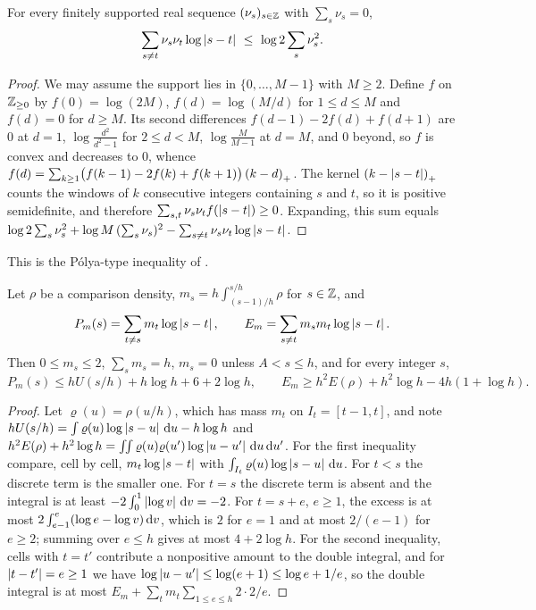 \begin{lemma}\label{lem:polya}
For every finitely supported real sequence $(\nu_s)_{s\in\mathbb{Z}}$ with $\sum_s\nu_s=0$,
\[
  \sum_{s\ne t}\nu_s\nu_t\log\abs{s-t}\ \le\ \log2\sum_s\nu_s^2 .
\]
\end{lemma}

\begin{proof}
We may assume the support lies in $\{0,\dots,M-1\}$ with $M\ge2$. Define $f$ on $\mathbb{Z}_{\ge0}$ by
$f(0)=\log(2M)$, $f(d)=\log(M/d)$ for $1\le d\le M$ and $f(d)=0$ for $d\ge M$. Its second
differences $f(d-1)-2f(d)+f(d+1)$ are $0$ at $d=1$, $\log\frac{d^2}{d^2-1}$ for $2\le d<M$,
$\log\frac M{M-1}$ at $d=M$, and $0$ beyond, so $f$ is convex and decreases to $0$, whence
$f(d)=\sum_{k\ge1}\bigl(f(k-1)-2f(k)+f(k+1)\bigr)\left(k-d\right)_{+}$. The kernel
$\left(k-\left\lvert s-t\right\rvert\right)_{+}$ counts the windows of $k$ consecutive integers containing $s$ and $t$, so it is
positive semidefinite, and therefore $\sum_{s,t}\nu_s\nu_tf(\left\lvert s-t\right\rvert)\ge0$. Expanding,
this sum equals $\log2\sum_s\nu_s^2+\log M\,(\sum_s\nu_s)^2-\sum_{s\ne t}\nu_s\nu_t\log\left\lvert s-t\right\rvert$.
\end{proof}

This is the Pólya-type inequality of \cite[Lemma~6.4]{Krisman2026chi2}.

\begin{lemma}[discretisation]\label{lem:discretisation}
Let $\rho$ be a comparison density, $m_s=h\int_{(s-1)/h}^{s/h}\rho$ for $s\in\mathbb{Z}$, and
\[
  P_m(s)=\sum_{t\ne s}m_t\log\left\lvert s-t\right\rvert,\qquad E_m=\sum_{s\ne t}m_sm_t\log\left\lvert s-t\right\rvert.
\]
Then $0\le m_s\le2$, $\sum_sm_s=h$, $m_s=0$ unless $A<s\le h$, and for every integer $s$,
\[
  P_m(s)\le hU(s/h)+h\log h+6+2\log h,\qquad E_m\ge h^2E(\rho)+h^2\log h-4h(1+\log h).
\]
\end{lemma}

\begin{proof}
Let $\varrho(u)=\rho(u/h)$, which has mass $m_t$ on $I_t=[t-1,t]$, and note
$hU(s/h)=\int\varrho(u)\log\left\lvert s-u\right\rvert\,\mathrm{d} u-h\log h$ and
$h^2E(\rho)+h^2\log h=\iint\varrho(u)\varrho(u')\log\left\lvert u-u'\right\rvert\,\mathrm{d} u\,\mathrm{d} u'$. For the first
inequality compare, cell by cell, $m_t\log\left\lvert s-t\right\rvert$ with $\int_{I_t}\varrho(u)\log\left\lvert s-u\right\rvert\,\mathrm{d}
u$. For $t<s$ the discrete term is the smaller one. For $t=s$ the discrete term is absent and
the integral is at least $-2\int_0^1\left\lvert \log v\right\rvert\,\mathrm{d} v=-2$. For $t=s+e$, $e\ge1$, the excess is at
most $2\int_{e-1}^{e}(\log e-\log v)\,\mathrm{d} v$, which is $2$ for $e=1$ and at most $2/(e-1)$ for
$e\ge2$; summing over $e\le h$ gives at most $4+2\log h$. For the second inequality, cells with
$t=t'$ contribute a nonpositive amount to the double integral, and for $\left\lvert t-t'\right\rvert=e\ge1$ we
have $\log\left\lvert u-u'\right\rvert\le\log(e+1)\le\log e+1/e$, so the double integral is at most
$E_m+\sum_tm_t\sum_{1\le e\le h}2\cdot2/e$.
\end{proof}

